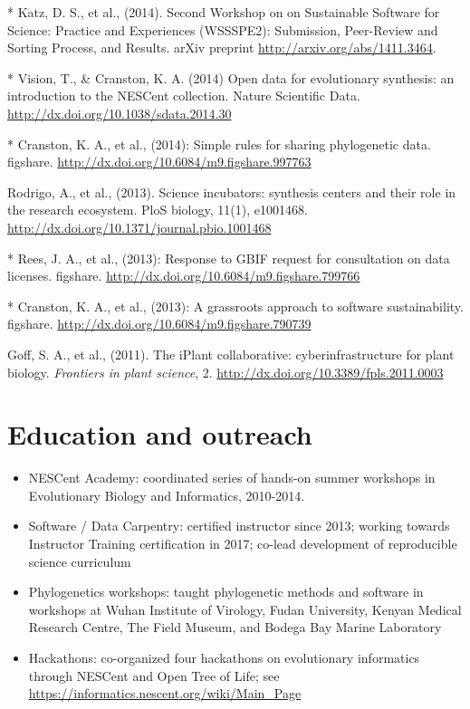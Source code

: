 \documentclass[10pt]{article}
\begin{document}
* Katz, D. S., et al., (2014). Second Workshop on on Sustainable Software for Science: Practice and Experiences (WSSSPE2): Submission, Peer-Review and Sorting Process, and Results. arXiv preprint \url{http://arxiv.org/abs/1411.3464}.

* Vision, T., \& Cranston, K. A. (2014) Open data for evolutionary synthesis: an introduction to the NESCent collection. Nature Scientific Data. \url{http://dx.doi.org/10.1038/sdata.2014.30}

* Cranston, K. A., et al., (2014): Simple rules for sharing phylogenetic data. figshare. \url{http://dx.doi.org/10.6084/m9.figshare.997763}

Rodrigo, A., et al., (2013). Science incubators: synthesis centers and their role in the research ecosystem. PloS biology, 11(1), e1001468. \url{http://dx.doi.org/10.1371/journal.pbio.1001468} 

* Rees, J. A., et al., (2013): Response to GBIF request for consultation on data licenses. figshare. \url{http://dx.doi.org/10.6084/m9.figshare.799766}

* Cranston, K. A., et al., (2013): A grassroots approach to software sustainability. figshare.
\url{http://dx.doi.org/10.6084/m9.figshare.790739}

Goff, S. A., et al., (2011). The iPlant collaborative: cyberinfrastructure for plant biology. \textit{Frontiers in plant science}, 2. \url{http://dx.doi.org/10.3389/fpls.2011.0003} 

\section*{Education and outreach}

\begin{itemize}
\item{NESCent Academy: coordinated series of hands-on summer workshops in Evolutionary Biology and Informatics, 2010-2014.}
\item{Software / Data Carpentry: certified instructor since 2013; working towards Instructor Training certification in 2017; co-lead development of reproducible science curriculum}
\item{Phylogenetics workshops: taught phylogenetic methods and software in workshops at Wuhan Institute of Virology, Fudan University, Kenyan Medical Research Centre, The Field Museum, and Bodega Bay Marine Laboratory} 
\item{Hackathons: co-organized four hackathons on evolutionary informatics through NESCent and Open Tree of Life; see \url{https://informatics.nescent.org/wiki/Main_Page}}
\end{itemize}
\end{document}
